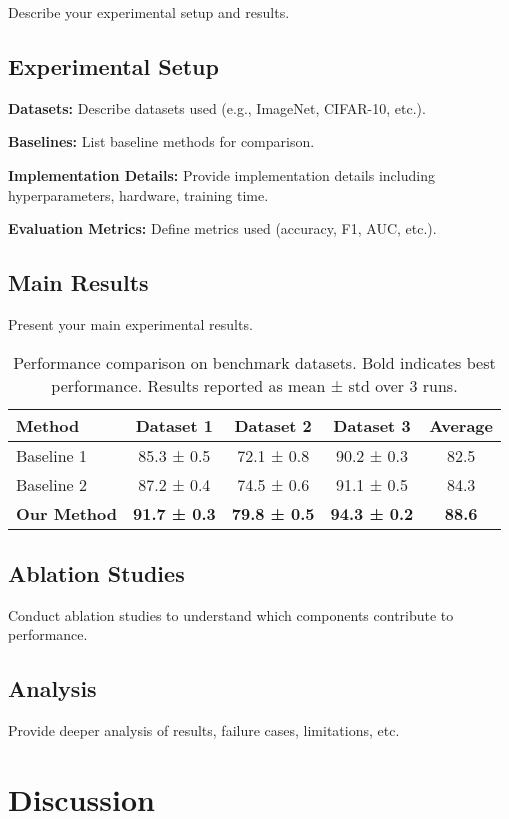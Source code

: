 \documentclass{article}
\begin{document}
Describe your experimental setup and results.

\subsection{Experimental Setup}
\textbf{Datasets:} Describe datasets used (e.g., ImageNet, CIFAR-10, etc.).

\textbf{Baselines:} List baseline methods for comparison.

\textbf{Implementation Details:} Provide implementation details including hyperparameters, hardware, training time.

\textbf{Evaluation Metrics:} Define metrics used (accuracy, F1, AUC, etc.).

\subsection{Main Results}
Present your main experimental results.

\begin{table}[t]
\centering
\caption{Performance comparison on benchmark datasets. Bold indicates best performance. Results reported as mean ± std over 3 runs.}
\label{tab:main_results}
\begin{tabular}{lcccc}
\toprule
Method & Dataset 1 & Dataset 2 & Dataset 3 & Average \\
\midrule
Baseline 1 & 85.3 ± 0.5 & 72.1 ± 0.8 & 90.2 ± 0.3 & 82.5 \\
Baseline 2 & 87.2 ± 0.4 & 74.5 ± 0.6 & 91.1 ± 0.5 & 84.3 \\
\textbf{Our Method} & \textbf{91.7 ± 0.3} & \textbf{79.8 ± 0.5} & \textbf{94.3 ± 0.2} & \textbf{88.6} \\
\bottomrule
\end{tabular}
\end{table}

\subsection{Ablation Studies}
Conduct ablation studies to understand which components contribute to performance.

\subsection{Analysis}
Provide deeper analysis of results, failure cases, limitations, etc.

\section{Discussion}
\label{sec:discussion}
\end{document}
